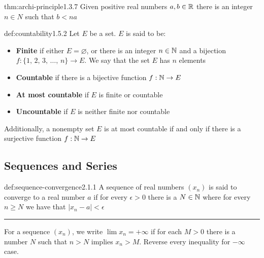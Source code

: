\documentclass[landscape, 8pt]{extarticle}
\begin{document}
\begin{multicols}{3}

\begin{thm}{thm:archi-principle}{1.3.7}
Given positive real numbers $a,b\in \mathbb{R}$ there is an integer $n \in N$ such that $b<na$
\end{thm}
\vspace{-5pt}

\begin{dfn}[Countability]{def:countability}{1.5.2}
Let $E$ be a set. $E$ is said to be:
\vspace{-5pt}
\renewcommand\labelitemi{\tiny$\bullet$}
\begin{itemize}
    \setlength\itemsep{0em}
    \item \textbf{Finite} if either $E=\varnothing$, or there is an integer $n\in \mathbb{N}$ and a bijection $f : \{1,\, 2,\, 3,\, \dots ,\, n\} \to E$. We say that the set $E$ has $n$ elements
    \item \textbf{Countable} if there is a bijective function $f:\mathbb{N}\to E$
    \item \textbf{At most countable} if $E$ is finite or countable
    \item \textbf{Uncountable} if $E$ is neither finite nor countable
\end{itemize}
Additionally, a nonempty set $E$ is at most countable if and only if there is a surjective function $f:\mathbb{N}\to E$
\end{dfn}

\subsection*{Sequences and Series}

\begin{dfn}{def:sequence-convergence}{2.1.1}
A sequence of real numbers $(x_{n})$ is said to converge to a real number $a$ if for every $\epsilon> 0$ there is a $N\in \mathbb{N}$ where for every $n\ge N$ we have that $\lvert x_{n}- a \rvert < \epsilon $
\vspace{2pt}
\hrule
\vspace{2pt}
\noindent For a sequence $(x_{n})$, we write $\lim x_{n}=+\infty$ if for each $M>0$ there is a number $N$ such that $n>N$ implies $x_{n} > M$. Reverse every inequality for $-\infty$ case.
\end{dfn}
\vspace{-5pt}


\end{multicols}
\end{document}
